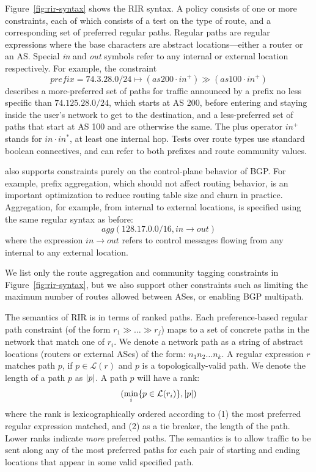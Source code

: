 
Figure~\ref{fig:rir-syntax} shows the RIR syntax. A policy consists of one or more constraints, each of which consists of a test on the type of route, and a corresponding set of preferred regular paths. Regular paths are regular expressions where the base characters are abstract locations---either a router or an AS. Special \textit{in} and \textit{out} symbols refer to any internal or external location respectively.
For example, the constraint
$$prefix=74.3.28.0/24 \mapsto (as200 \cdot in^+) \gg (as100 \cdot in^+)$$
describes a more-preferred set of paths for traffic announced by a prefix no less specific than $74.125.28.0/24$, which starts at AS 200, before entering and staying inside the user's network to get to the destination, and a less-preferred set of paths that start at AS 100 and are otherwise the same. The plus operator $in^+$ stands for $in \cdot in^*$, at least one internal hop. Tests over route types use standard boolean connectives, and can refer to both prefixes and route community values.

\sysname also supports constraints purely on the control-plane behavior of BGP. For example, prefix aggregation, which should not affect routing behavior, is an important optimization to reduce routing table size and churn in practice. Aggregation, for example, from internal to external locations, is specified using the same regular syntax as before:
$$agg(128.17.0.0/16, in \rightarrow out)$$
where the expression $in \rightarrow out$ refers to control messages flowing from any internal to any external location.

We list only the route aggregation and community tagging constraints in Figure~\ref{fig:rir-syntax}, but we also support other constraints such as limiting the maximum number of routes allowed between ASes, or enabling BGP multipath.



The semantics of RIR is in terms of ranked paths. Each preference-based regular path constraint (of the form $r_1 \gg \dots \gg r_j$) maps to a set of concrete paths in the network that match one of $r_i$. We denote a network path as a string of abstract locations (routers or external ASes) of the form: $n_1 n_2 \dots n_k$. A regular expression $r$ matches path $p$, if $p \in \mathcal{L}(r)$ and $p$ is a topologically-valid path. We denote the length of a path $p$ as $ \lvert p \rvert $. A path $p$ will have a rank:
$$(\min_i \{  p \in \mathcal{L}(r_i)  \} ,  \lvert p \rvert )$$
where the rank is lexicographically ordered according to (1) the most preferred regular expression matched, and (2) as a tie breaker, the length of the path. Lower ranks indicate \emph{more} preferred paths. The semantics is to allow traffic to be sent along any of the most preferred paths for each pair of starting and ending locations that appear in some valid specified path.

